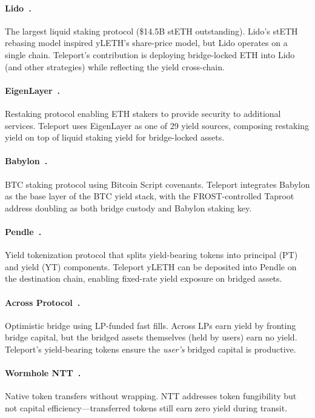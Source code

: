 \documentclass[11pt,twocolumn]{article}
\begin{document}
\paragraph{Lido~\cite{lidofinance}.} The largest liquid staking protocol (\$14.5B stETH outstanding). Lido's stETH rebasing model inspired yLETH's share-price model, but Lido operates on a single chain. Teleport's contribution is deploying bridge-locked ETH into Lido (and other strategies) while reflecting the yield cross-chain.

\paragraph{EigenLayer~\cite{eigenlayer2023}.} Restaking protocol enabling ETH stakers to provide security to additional services. Teleport uses EigenLayer as one of 29 yield sources, composing restaking yield on top of liquid staking yield for bridge-locked assets.

\paragraph{Babylon~\cite{babylon2024}.} BTC staking protocol using Bitcoin Script covenants. Teleport integrates Babylon as the base layer of the BTC yield stack, with the FROST-controlled Taproot address doubling as both bridge custody and Babylon staking key.

\paragraph{Pendle~\cite{pendle2023}.} Yield tokenization protocol that splits yield-bearing tokens into principal (PT) and yield (YT) components. Teleport yLETH can be deposited into Pendle on the destination chain, enabling fixed-rate yield exposure on bridged assets.

\paragraph{Across Protocol~\cite{across2023}.} Optimistic bridge using LP-funded fast fills. Across LPs earn yield by fronting bridge capital, but the bridged assets themselves (held by users) earn no yield. Teleport's yield-bearing tokens ensure the \emph{user's} bridged capital is productive.

\paragraph{Wormhole NTT~\cite{wormhole}.} Native token transfers without wrapping. NTT addresses token fungibility but not capital efficiency---transferred tokens still earn zero yield during transit.
\end{document}
